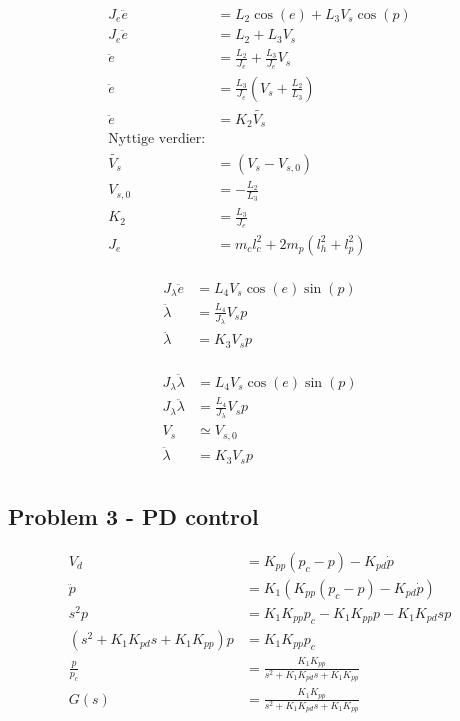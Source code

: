 \begin{align*}
    J_e \ddot{e} &= L_2 \cos(e) + L_3 V_s \cos(p) \\
    J_e \ddot{e} &= L_2 + L_3 V_s  \\
    \ddot{e} &= \frac{L_2}{J_e} + \frac{L_3}{J_e} V_s  \\
    \ddot{e} &= \frac{L_3}{J_e} (V_s +\frac{L_2}{L_3})  \\
    \ddot{e} &= K_2 \tilde{V_s}  \\
    \text{Nyttige verdier:}\\
    \tilde{V_s}&=(V_s - V_{s,0}) \\
    V_{s,0} &=-\frac{L_2}{L_3} \\
    K_2 &=\frac{L_3}{J_e} \\
    J_e &= m_c l_c^2 + 2m_p(l_h^2+l_p^2)\\ 
\end{align*}

\begin{align*}
    J_\lambda \ddot{e} &= L_4 V_s \cos(e) \sin(p)\\
    \ddot{\lambda} &= \frac{L_4}{J_\lambda} V_s p\\
    \ddot{\lambda} &= K_3 V_s p\\
\end{align*}

\begin{align*}
    J_\lambda \ddot{\lambda}&= L_4 V_s \cos(e) \sin(p)\\
    J_\lambda \ddot{\lambda}&= \frac{L_4}{J_\lambda} V_s p \\
    V_s & \simeq V_{s,0} \\
    \ddot{\lambda}&= K_3 V_s p \\
\end{align*}

\subsection{Problem 3 - PD control}

\begin{align*}
    V_d &= K_{pp} (p_c - p) - K_{pd} \dot{p}\\
    \ddot{p} &= K_1 (K_{pp} (p_c - p) - K_{pd} \dot{p})\\
    s^2 p &= K_1 K_{pp} p_c - K_1 K_{pp} p - K_1 K_{pd} s p\\
    (s^2 + K_1 K_{pd} s + K_1 K_{pp}) p &= K_1 K_{pp} p_c\\
    \frac{p}{p_c} &= \frac{K_1 K_{pp}}{s^2 + K_1 K_{pd} s + K_1 K_{pp}}\\
    G(s) &= \frac{K_1 K_{pp}}{s^2 + K_1 K_{pd} s + K_1 K_{pp}}\\
\end{align*}


